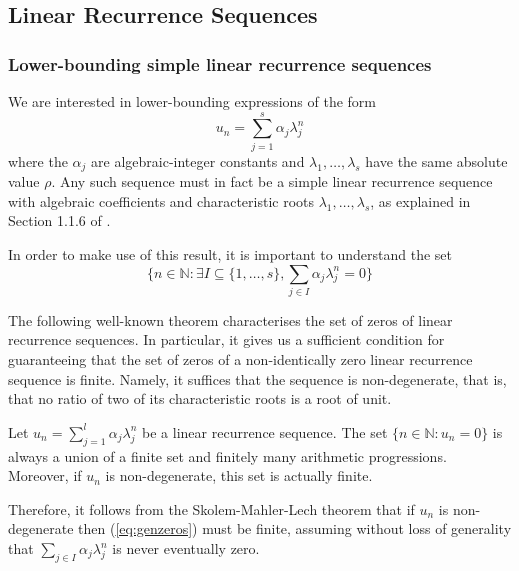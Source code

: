 \subsection{Linear Recurrence Sequences}

\subsubsection{Lower-bounding simple linear recurrence sequences}

We are interested in lower-bounding expressions of the form
\begin{equation}
\label{eq:sum}
u_n=\sum\limits_{j=1}^s\alpha_j\lambda_j^n
\end{equation}
where the $\alpha_j$ are algebraic-integer constants and $\lambda_1,\ldots,\lambda_s$ have the same absolute value $\rho$. Any such sequence must in fact be a simple linear recurrence sequence with algebraic coefficients and characteristic roots $\lambda_1,\ldots,\lambda_s$, as explained in Section 1.1.6 of \cite{BOOK}.

In order to make use of this result, it is important to understand the set
\begin{equation}
\lbrace n\in\mathbb{N}: \exists I\subseteq \lbrace 1,\ldots,s\rbrace, \sum\limits_{j\in I}\alpha_j\lambda_j^n=0\rbrace
\label{eq:genzeros}
\end{equation}

The following well-known theorem characterises the set of zeros of
linear recurrence sequences. In particular, it gives us a sufficient
condition for guaranteeing that the set of zeros of a non-identically
zero linear recurrence sequence is finite. Namely, it suffices that the sequence is non-degenerate, that is, that no ratio of two of its characteristic roots is a root of unit.

\begin{theorem}
Let $u_n=\sum\limits_{j=1}^l \alpha_j\lambda_j^n$ be a linear recurrence sequence. The set $\lbrace n\in\mathbb{N}: u_n=0\rbrace$ is always a union of a finite set and finitely many arithmetic progressions. Moreover, if $u_n$ is non-degenerate, this set is actually finite.
\end{theorem}

Therefore, it follows from the Skolem-Mahler-Lech theorem that if $u_n$ is non-degenerate  then (\ref{eq:genzeros}) must be finite, assuming without loss of generality that $\sum\limits_{j\in I}\alpha_j\lambda_j^n$ is never eventually zero.

